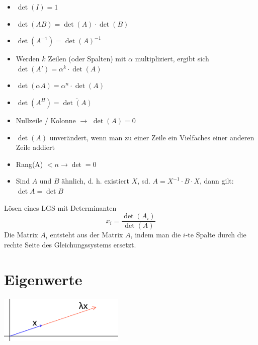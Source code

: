\documentclass[a4paper,twocolumn]{article}
\begin{document}
	\begin{feig}[Eigenschaften]
		\begin{itemize}
		\item $\det(I) = 1$\\[-6mm]
		\item $\det(AB) = \det(A) \cdot \det(B)$\\[-6mm]
		\item $\det(A^{-1}) = \det(A)^{-1}$\\[-6mm]
		\item Werden $k$ Zeilen (oder Spalten) mit $\alpha$ multipliziert, ergibt sich $\det(A') = \alpha^k \cdot \det(A)$\\[-6mm]
		\item $\det(\alpha A) = \alpha^n \cdot \det(A) $\\[-6mm]
		\item $\det(A^{H}) = \overline{\det(A)}$\\[-6mm]
		\item Nullzeile / Kolonne $\rightarrow$ $\det(A) = 0$\\[-6mm]
		\item $\det(A)$ unverändert, wenn man zu einer Zeile ein Vielfaches einer anderen Zeile addiert\\[-6mm]
		\item Rang(A) $< n \rightarrow \det = 0$\\[-6mm]
		\item Sind $A$ und $B$ ähnlich, d. h. existiert $X$, sd. $A = X^{-1}\cdot B\cdot X$, dann gilt: $\det A = \det B$\\[-6mm]
		\end{itemize}
	\end{feig}

	\begin{fsatz}
		Lösen eines LGS mit Determinanten\\
		$$x_i = \frac{\det(A_i)}{\det(A)}$$
		Die Matrix $A_i$ entsteht aus der Matrix $A$, indem man die $i$-te Spalte durch die rechte Seite des Gleichungssystems ersetzt.
	\end{fsatz}
\section{Eigenwerte}

	\includegraphics[width=6cm]{eigen}
\end{document}
